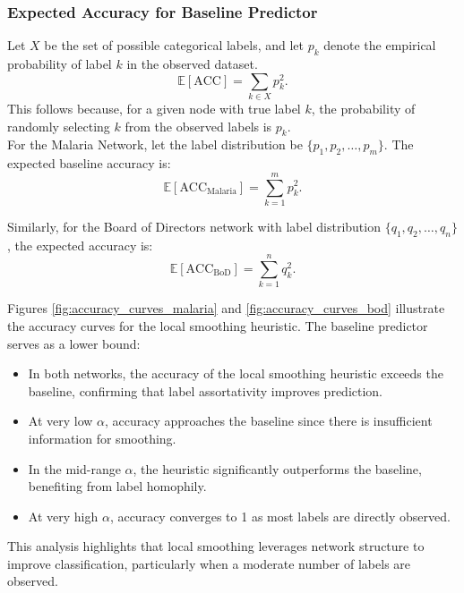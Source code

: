 \documentclass[12pt]{article}
\begin{document}
\subsubsection*{Expected Accuracy for Baseline Predictor}

Let $X$ be the set of possible categorical labels, and let $p_k$ denote the empirical probability of label $k$ in the observed dataset.
\begin{equation}
    \mathbb{E}[\text{ACC}] = \sum_{k \in X} p_k^2.
\end{equation}
This follows because, for a given node with true label $k$, the probability of randomly selecting $k$ from the observed labels is $p_k$.\\

\noindent For the Malaria Network, let the label distribution be $\{p_1, p_2, \dots, p_m\}$. The expected baseline accuracy is:
\begin{equation}
    \mathbb{E}[\text{ACC}_{\text{Malaria}}] = \sum_{k=1}^{m} p_k^2.
\end{equation}

\noindent Similarly, for the Board of Directors network with label distribution $\{q_1, q_2, \dots, q_n\}$, the expected accuracy is:
\begin{equation}
    \mathbb{E}[\text{ACC}_{\text{BoD}}] = \sum_{k=1}^{n} q_k^2.
\end{equation}

\noindent Figures \ref{fig:accuracy_curves_malaria} and \ref{fig:accuracy_curves_bod} illustrate the accuracy curves for the local smoothing heuristic. The baseline predictor serves as a lower bound:

\begin{itemize}
    \item In both networks, the accuracy of the local smoothing heuristic exceeds the baseline, confirming that label assortativity improves prediction.
    \item At very low $\alpha$, accuracy approaches the baseline since there is insufficient information for smoothing.
    \item In the mid-range $\alpha$, the heuristic significantly outperforms the baseline, benefiting from label homophily.
    \item At very high $\alpha$, accuracy converges to 1 as most labels are directly observed.
\end{itemize}

This analysis highlights that local smoothing leverages network structure to improve classification, particularly when a moderate number of labels are observed.
\end{document}
